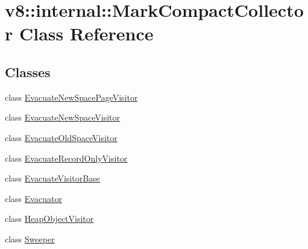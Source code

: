\hypertarget{classv8_1_1internal_1_1_mark_compact_collector}{}\section{v8\+:\+:internal\+:\+:Mark\+Compact\+Collector Class Reference}
\label{classv8_1_1internal_1_1_mark_compact_collector}
\subsection*{Classes}
\begin{DoxyCompactItemize}
\item 
class \hyperlink{classv8_1_1internal_1_1_mark_compact_collector_1_1_evacuate_new_space_page_visitor}{Evacuate\+New\+Space\+Page\+Visitor}
\item 
class \hyperlink{classv8_1_1internal_1_1_mark_compact_collector_1_1_evacuate_new_space_visitor}{Evacuate\+New\+Space\+Visitor}
\item 
class \hyperlink{classv8_1_1internal_1_1_mark_compact_collector_1_1_evacuate_old_space_visitor}{Evacuate\+Old\+Space\+Visitor}
\item 
class \hyperlink{classv8_1_1internal_1_1_mark_compact_collector_1_1_evacuate_record_only_visitor}{Evacuate\+Record\+Only\+Visitor}
\item 
class \hyperlink{classv8_1_1internal_1_1_mark_compact_collector_1_1_evacuate_visitor_base}{Evacuate\+Visitor\+Base}
\item 
class \hyperlink{classv8_1_1internal_1_1_mark_compact_collector_1_1_evacuator}{Evacuator}
\item 
class \hyperlink{classv8_1_1internal_1_1_mark_compact_collector_1_1_heap_object_visitor}{Heap\+Object\+Visitor}
\item 
class \hyperlink{classv8_1_1internal_1_1_mark_compact_collector_1_1_sweeper}{Sweeper}
\end{DoxyCompactItemize}
